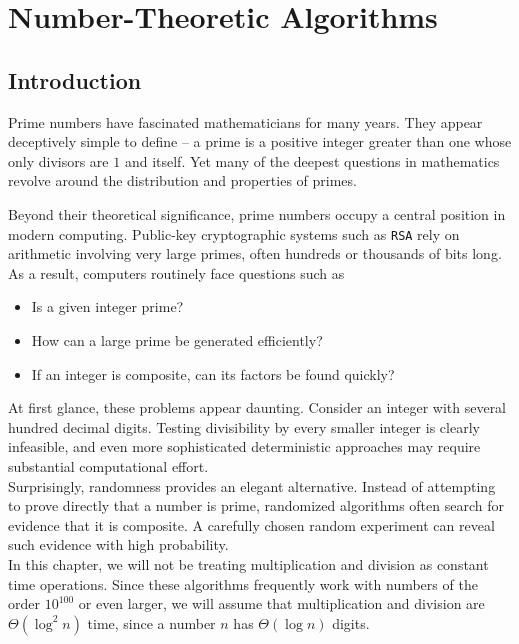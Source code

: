 \chapter{Number-Theoretic Algorithms}

\section{Introduction}

Prime numbers have fascinated mathematicians for many years. 
They appear deceptively simple to define -- a prime is 
a positive integer greater than one whose only divisors 
are $1$ and itself. Yet many of the deepest questions in 
mathematics revolve around the distribution and properties of primes.

Beyond their theoretical significance, prime numbers occupy a central position in modern computing. 
Public-key cryptographic systems such as \texttt{RSA} rely on arithmetic 
involving very large primes, often hundreds or thousands of bits long. 
As a result, computers routinely face questions such as

\begin{itemize}
\item Is a given integer prime?
\item How can a large prime be generated efficiently?
\item If an integer is composite, can its factors be found quickly?
\end{itemize}

At first glance, these problems appear daunting. Consider an 
integer with several hundred decimal digits. Testing 
divisibility by every smaller integer is clearly infeasible, 
and even more sophisticated deterministic approaches 
may require substantial computational effort.\\

\noindent Surprisingly, randomness provides an elegant alternative. Instead of attempting to prove 
directly that a number is prime, randomized algorithms often 
search for evidence that it is composite. A carefully 
chosen random experiment can reveal such evidence with high probability. \\


\noindent In this chapter, we will not be treating multiplication and 
division as constant time operations. Since these algorithms frequently work with numbers 
of the order $10^100$ or even larger, we will assume that multiplication and division are 
$\Theta(\log^2 n)$ time, since a number $n$ has $\Theta(\log n)$ digits.
